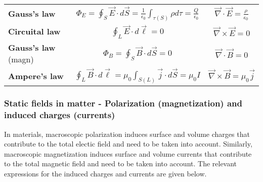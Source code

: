 \documentclass[english,11pt]{article}
\begin{document}
{\small
\begin{center}
{
  \begin{table}[H]
    \begin{tabular}{|l|c|c|}
      \hline
      {\bf Gauss's law} &
        $\Phi_{E} = \displaystyle \oint_{S} \vec{E} \cdot d\vec{S} = \frac{1}{\epsilon_0} \int_{\tau(S)} \rho d\tau = \frac{Q}{\epsilon_0}$ &
        $\displaystyle \vec{\nabla} \cdot \vec{E} = \frac{\rho}{\epsilon_0}$ \\

      {\bf Circuital law} &
        $\displaystyle \oint_{L} \vec{E} \cdot d\vec{\ell} = 0$ &
        $\displaystyle \vec{\nabla} \times \vec{E} = 0$ \\

      {\bf Gauss's law} (magn) &
        $\Phi_{B} = \displaystyle  \oint_{S} \vec{B} \cdot d\vec{S} = 0$ &
        $\displaystyle  \vec{\nabla} \cdot \vec{B} = 0$ \\

      {\bf Ampere's law} &
        $\displaystyle \oint_{L} \vec{B} \cdot d\vec{\ell} = \mu_{0} \int_{S(L)} \vec{j} \cdot d\vec{S} = \mu_{0} I$ &
        $\displaystyle \vec{\nabla} \times \vec{B} = \mu_{0} \vec{j}$ \\
      \hline
    \end{tabular}
  \end{table}
}
\end{center}
}%

\subsubsection*{\bf Static fields in matter -
 Polarization (magnetization) and induced charges (currents)}

In materials, macroscopic polarization induces surface and volume charges that
contribute to the total electic field and need to be taken into account.
Similarly, macroscopic magnetization induces surface and volume currents that
contribute to the total magnetic field and need to be taken into account.
The relevant expressions for the induced charges and currents are given below.
\end{document}
